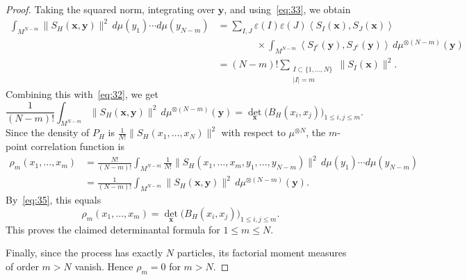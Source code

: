 \documentclass[10pt,a4paper]{amsart}
\def\leq{\leqslant}
\begin{document}
\begin{proof}
Taking the squared norm, integrating over $\mathbf y$, and using~\eqref{eq:33}, we obtain
\[
\begin{aligned}
\int_{M^{N-m}}
\|S_H(\mathbf x,\mathbf y)\|^2
\,d\mu(y_1)\cdots d\mu(y_{N-m})
&=
\sum_{I,J}
\varepsilon(I)\varepsilon(J)
\left\langle S_I(\mathbf x),S_J(\mathbf x)\right\rangle
\\
&\qquad\qquad\times
\int_{M^{N-m}}
\left\langle
S_{I^c}(\mathbf y),S_{J^c}(\mathbf y)
\right\rangle
\,d\mu^{\otimes(N-m)}(\mathbf y)
\\
&=
(N-m)!
\sum_{\substack{I\subset\{1,\ldots,N\}\\ |I|=m}}
\|S_I(\mathbf x)\|^2.
\end{aligned}
\]
Combining this with~\eqref{eq:32}, we get
\begin{equation}\label{eq:35}
\frac{1}{(N-m)!}
\int_{M^{N-m}}
\|S_H(\mathbf x,\mathbf y)\|^2
\,d\mu^{\otimes(N-m)}(\mathbf y)
=
\det_{\mathbf x}\bigl(B_H(x_i,x_j)\bigr)_{1\leq i,j\leq m}.
\end{equation}
Since the density of $P_H$ is $\frac{1}{N!}\|S_H(x_1,\ldots,x_N)\|^2$ with respect to $\mu^{\otimes N}$, the $m$-point correlation function is
\[
\begin{aligned}
\rho_m(x_1,\ldots,x_m)
&=
\frac{N!}{(N-m)!}
\int_{M^{N-m}}
\frac{1}{N!}
\|S_H(x_1,\ldots,x_m,y_1,\ldots,y_{N-m})\|^2
\,d\mu(y_1)\cdots d\mu(y_{N-m})
\\
&=
\frac{1}{(N-m)!}
\int_{M^{N-m}}
\|S_H(\mathbf x,\mathbf y)\|^2
\,d\mu^{\otimes(N-m)}(\mathbf y).
\end{aligned}
\]
By~\eqref{eq:35}, this equals
\[
\rho_m(x_1,\ldots,x_m)
=
\det_{\mathbf x}\bigl(B_H(x_i,x_j)\bigr)_{1\leq i,j\leq m}.
\]
This proves the claimed determinantal formula for $1\leq m\leq N$.

Finally, since the process has exactly $N$ particles, its factorial moment measures of order $m>N$ vanish. Hence $\rho_m=0$ for $m>N$.
\end{proof}
\end{document}
